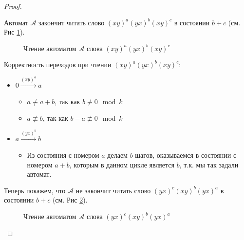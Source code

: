 \documentclass{article}
\begin{document}
\begin{proof}
\begin{enumerate}
			Автомат $\mathscr{A}$ закончит читать слово $(xy)^a(yx)^b(xy)^c$ в состоянии $b+c$ (см. Рис \ref{process1_cycle_a+b_b}).
			
			\begin{figure}
				\caption{Чтение автоматом $\mathscr{A}$ слова $(xy)^a(yx)^b(xy)^c$}
				\label{process1_cycle_a+b_b}
			\end{figure}
			
			Корректность переходов при чтении $(xy)^a(yx)^b(xy)^c$:
			\begin{itemize}
				\item $0 \xrightarrow{(xy)^a} a$
				\begin{itemize}
					\item $a \not \equiv a+b$, так как $b \not \equiv 0 \mod k$
					\item $a \not \equiv b$, так как $b-a \not \equiv 0 \mod k$
				\end{itemize}
				\item $a \xrightarrow{(yx)^b} b$
				\begin{itemize}
					\item Из состояния с номером $a$ делаем $b$ шагов, оказываемся в состоянии с номером $a+b$, которым в данном цикле является $b$, т.к. мы так задали автомат.
				\end{itemize}
			\end{itemize}
			
			Теперь покажем, что $\mathscr{A}$ не закончит читать слово $(yx)^c(xy)^b(yx)^a$ в состоянии $b+c$ (см. Рис \ref{process2_cycle_a+b_b}).
			
			\begin{figure}
				\caption{Чтение автоматом $\mathscr{A}$ слова $(yx)^c(xy)^b(yx)^a$}
				\label{process2_cycle_a+b_b}
			\end{figure}
		

\end{enumerate}
\end{proof}
\end{document}
